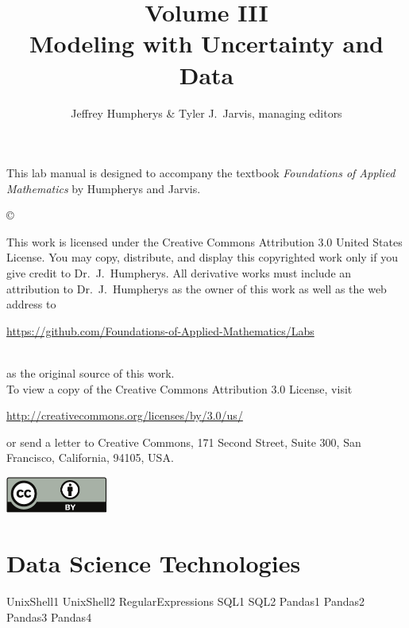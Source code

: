 \documentclass[opener-c,labs,yellow,nociteref]{HJnewsiambook}
\title{Volume III\\ Modeling with Uncertainty and Data}
\author{Jeffrey Humpherys \& Tyler J.~Jarvis, managing editors}
\begin{document}

\thispagestyle{empty} %
\maketitle
\thispagestyle{empty}
\frontmatter



\begin{thepreface} %

This lab manual is designed to accompany the textbook \emph{Foundations of Applied Mathematics} by Humpherys and Jarvis.

\vfill
\copyright{This work is licensed under the Creative Commons Attribution 3.0 United States License.
You may copy, distribute, and display this copyrighted work only if you give credit to Dr.~J.~Humpherys.
All derivative works must include an attribution to Dr.~J.~Humpherys as the owner of this work as well as the web address to
\\\centerline{\url{https://github.com/Foundations-of-Applied-Mathematics/Labs}}\\as the original source of this work.
\\To view a copy of the Creative Commons Attribution 3.0 License, visit
\\\centerline{\url{http://creativecommons.org/licenses/by/3.0/us/}} or send a letter to Creative Commons, 171 Second Street, Suite 300, San Francisco, California, 94105, USA.}

\vfill
\centering\includegraphics[height=1.2cm]{by.pdf}
\vfill
\end{thepreface}

\setcounter{tocdepth}{1}
\tableofcontents

\mainmatter %

\part{Data Science Technologies} %
{UnixShell1}
{UnixShell2}
{RegularExpressions}
{SQL1}
{SQL2}
{Pandas1}
{Pandas2}
{Pandas3}
{Pandas4}
\end{document}
